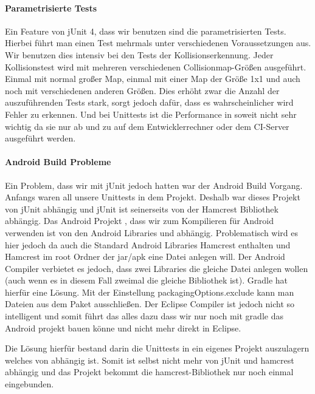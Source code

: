 \paragraph{Parametrisierte Tests}

Ein Feature von jUnit 4, dass wir benutzen sind die parametrisierten Tests\cite{JUPT}. 
Hierbei führt man einen Test mehrmals unter verschiedenen Voraussetzungen aus. 
Wir benutzen dies intensiv bei den Tests der Kollisionserkennung. 
Jeder Kollisionstest wird mit mehreren verschiedenen Collisionmap-Größen ausgeführt. 
Einmal mit normal großer Map, einmal mit einer Map der Größe 1x1 und auch noch mit verschiedenen anderen Größen. 
Dies erhöht zwar die Anzahl der auszuführenden Tests stark, sorgt jedoch dafür, dass es wahrscheinlicher wird Fehler zu erkennen. 
Und bei Unittests ist die Performance in soweit nicht sehr wichtig da sie nur ab und zu auf dem Entwicklerrechner oder dem CI-Server ausgeführt werden.

\paragraph{Android Build Probleme}

Ein Problem, dass wir mit jUnit jedoch hatten war der Android Build Vorgang. 
Anfangs waren all unsere Unittests in dem  Projekt. Deshalb war dieses Projekt von jUnit abhängig und jUnit ist seinerseits von der Hamcrest Bibliothek abhängig\cite{HCRST}. 
Das Android Projekt , dass wir zum Kompilieren für Android verwenden ist von den Android Libraries und  abhängig.
Problematisch wird es hier jedoch da auch die Standard Android Libraries Hamcrest enthalten und Hamcrest im root Ordner der jar/apk eine Datei  anlegen will. Der Android Compiler verbietet es jedoch, dass zwei Libraries die gleiche Datei anlegen wollen (auch wenn es in diesem Fall zweimal die gleiche Bibliothek ist).
Gradle hat hierfür eine Lösung. Mit der Einstellung packagingOptions.exclude kann man Dateien aus dem Paket ausschließen. Der Eclipse Compiler ist jedoch nicht so intelligent und somit führt das alles dazu dass wir nur noch mit gradle das Android projekt bauen könne und nicht mehr direkt in Eclipse.

Die Lösung hierfür bestand darin die Unittests in ein eigenes Projekt  auszulagern welches von  abhängig ist. Somit ist  selbst nicht mehr von jUnit und hamcrest abhängig und das Projekt  bekommt die hamcrest-Bibliothek nur noch einmal eingebunden.